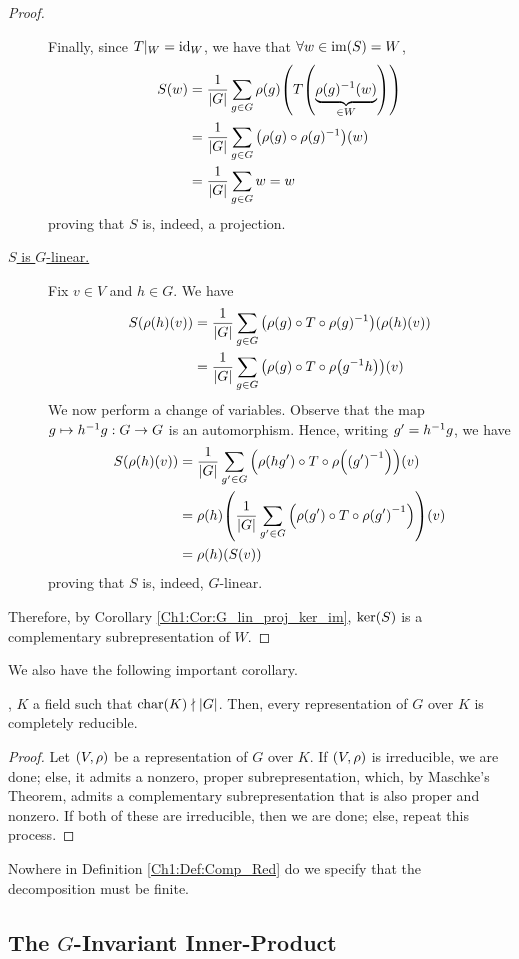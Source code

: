 \begin{proof}
\begin{description}
        Finally, since $T\vert_W = \operatorname{id}_W$, we have that $\forall w \in \operatorname{im}\!\left( S \right) = W$,
        \begin{align*}
            S(w) &= \frac{1}{\left\lvert G \right\rvert} \sum_{g \in G} \rho(g)\!\left( T\!\left( \underbrace{\rho(g)^{-1}(w)}_{\in W} \right) \right) \\
            &= \frac{1}{\left\lvert G \right\rvert} \sum_{g \in G} \left( \rho(g) \circ \rho(g)^{-1} \right)\!(w) \\
            &= \frac{1}{\left\lvert G \right\rvert} \sum_{g \in G} w = w
        \end{align*}
        proving that $S$ is, indeed, a projection.

        \item[\underline{$S$ is $G$-linear.}]
        Fix $v \in V$ and $h \in G$. We have
        \begin{align*}
            S\!\left( \rho(h)(v) \right) &= \frac{1}{\left\lvert G \right\rvert} \sum_{g \in G} \left( \rho(g) \circ T \circ \rho(g)^{-1} \right)\!\left( \rho(h)(v) \right) \\
            &=  \frac{1}{\left\lvert G \right\rvert} \sum_{g \in G} \left( \rho(g) \circ T \circ \rho\!\left( g^{-1} h \right) \right)\!(v)
        \end{align*}
        We now perform a change of variables. Observe that the map $g \mapsto h^{-1} g : G \to G$ is an automorphism. Hence, writing $g' = h^{-1} g$, we have
        \begin{align*}
            \Sof{\rho(h)(v)} &=  \frac{1}{\abs{G}} \sum_{g' \in G} \parenth{\rhoof{hg'} \circ T \circ \rhoof{\parenth{g'}\inv}}\!(v) \\
            &= \rhoof{h}\!\parenth{ \frac{1}{\abs{G}} \sum_{g' \in G} \parenth{\rhoof{g'} \circ T \circ \rhoof{g'}\inv}}\!(v) \\
            &= \rho(h)\!\parenth{\Sof{v}}
        \end{align*}
        proving that $S$ is, indeed, $G$-linear.
    \end{description}
    Therefore, by Corollary \ref{Ch1:Cor:G_lin_proj_ker_im}, $\operatorname{ker}\!\left( S \right)$ is a complementary subrepresentation of $W$.
\end{proof}

We also have the following important corollary.

\begin{corollary}
    , $K$ a field such that $\operatorname{char}\!\left( K \right) \nmid \left\lvert G \right\rvert$. Then, every representation of $G$ over $K$ is completely reducible.
\end{corollary}
\begin{proof}
    Let $\left( V, \rho \right)$ be a representation of $G$ over $K$. If $\left( V, \rho \right)$ is irreducible, we are done; else, it admits a nonzero, proper subrepresentation, which, by Maschke's Theorem, admits a complementary subrepresentation that is also proper and nonzero. If both of these are irreducible, then we are done; else, repeat this process.
\end{proof}

\begin{remark}
    Nowhere in Definition \ref{Ch1:Def:Comp_Red} do we specify that the decomposition must be finite.
\end{remark}

\subsection{The $G$-Invariant Inner-Product}

